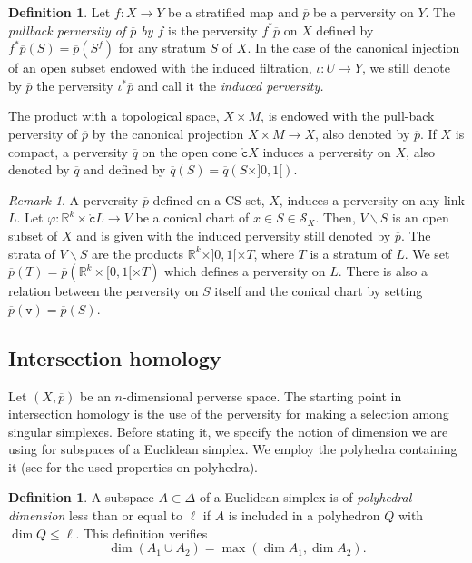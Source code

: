 \documentclass[a4paper,10pt,english,reqno]{amsart}
\theoremstyle{plain}
\theoremstyle{definition}
\newtheorem{definition}[proposition]{Definition}
\theoremstyle{remark}
\newtheorem{remark}[proposition]{Remark}
\numberwithin{equation}{section}
\def\R{{\mathbb R}}
\def\ov{\overline}
\def\cS{{\mathcal S}}
\def\tc{{\mathtt c}}
\def\tv{{\mathtt v}}
\def\R{\mathbb{R}}
\def\rc{{\mathring{\tc}}}
\def\menos{\backslash}
\renewcommand\1{\hbox{\ding{192}}}
\renewcommand\2{\hbox{\ding{193}}}
\newcommand\3{\hbox{\ding{194}}}
\newcommand\4{\hbox{\ding{195}}}
\begin{document}
\begin{definition}\label{def:backperversity}
Let $f\colon X\to Y$ be a stratified map and $\ov{p}$ be a perversity on $Y$. The \emph{pullback perversity of $\ov{p}$ by $f$}
is the perversity $f^*\ov{p}$ on $X$ defined by $f^*\ov{p}(S)=\ov{p}(S^f)$ for any stratum $S$ of $X$.
In the case of the canonical injection of an open subset endowed with the induced filtration, $\iota\colon U\to Y$, 
we still denote by $\ov{p}$ the perversity $\iota^*\ov{p}$ and call it the \emph{induced perversity.}
\end{definition}

%
The  product with a topological space, $X\times M$, is endowed with
the pull-back perversity of $\ov{p}$ by the canonical projection $X\times M\to X$, also denoted by $\ov{p}$. 
If $X$ is compact, a perversity $\ov{q}$ on the open cone  $\rc X$ induces a perversity on $X$,
also denoted by $\ov{q}$ and defined by
$\ov{q}(S)=\ov{q}(S\times ]0,1[)$. 

\begin{remark}\label{rem:perverselink}
A perversity $\ov{p}$ defined on a CS set, $X$,  induces a perversity on any link $L$.
%
Let $ \varphi\colon \R^k\times \rc L\to V$ be a conical chart of $x\in S\in \cS_{X}$.
Then, $V\menos S$ is an open subset of $X$ and is given with the induced perversity still denoted by $\ov{p}$. 
The strata of $V\menos S$ are the products $\R^k\times ]0,1[\times T$, where $T$ is a stratum of $L$. We set
$\ov{p}(T)=\ov{p}(\R^k\times [0,1[\times T)$ which defines a perversity on $L$.
There is also a relation between the perversity on $S$ itself and the conical chart by setting $\ov{p}(\tv)=\ov{p}(S)$.
\end{remark}

\subsection{Intersection homology}\label{sec:lesdeux}



Let $(X,\ov{p})$ be an $n$-dimensional perverse space.
The starting point  in intersection homology is the use of the perversity  for making
a selection among singular simplexes. 
 Before stating it, we   specify the notion of dimension we are using 
 for  subspaces of a Euclidean simplex. 
 We employ the polyhedra containing it (see \cite{MR0350744} for the used properties on polyhedra).
  
 
\begin{definition}\label{def:dimension}
A subspace $A\subset \Delta$ of a Euclidean simplex is of \emph{polyhedral dimension} less than or equal to $\ell$
 if  $A$ is included in a polyhedron $Q$ with $\dim Q\leq \ell$. This definition verifies
 \begin{equation}\label{equa:dimunion} 
 \dim (A_{1}\cup A_{2})= \max (\dim A_{1},\dim A_{2}).
 \end{equation}
\end{definition}
\end{document}
